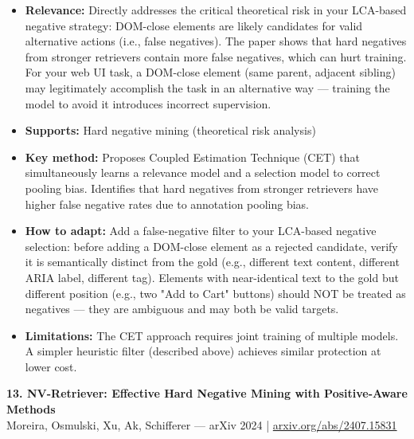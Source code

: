 \documentclass[pdflatex,sn-mathphys-num]{sn-jnl}
\theoremstyle{thmstyleone}
\theoremstyle{thmstyletwo}
\theoremstyle{thmstylethree}
\begin{document}
\begin{itemize}
    \item \textbf{Relevance:} Directly addresses the critical theoretical risk in your LCA-based negative strategy: DOM-close elements are likely candidates for valid alternative actions (i.e., false negatives). The paper shows that hard negatives from stronger retrievers contain more false negatives, which can hurt training. For your web UI task, a DOM-close element (same parent, adjacent sibling) may legitimately accomplish the task in an alternative way --- training the model to avoid it introduces incorrect supervision.
    \item \textbf{Supports:} \checkmark Hard negative mining (theoretical risk analysis)
    \item \textbf{Key method:} Proposes Coupled Estimation Technique (CET) that simultaneously learns a relevance model and a selection model to correct pooling bias. Identifies that hard negatives from stronger retrievers have higher false negative rates due to annotation pooling bias.
    \item \textbf{How to adapt:} Add a false-negative filter to your LCA-based negative selection: before adding a DOM-close element as a rejected candidate, verify it is semantically distinct from the gold (e.g., different text content, different ARIA label, different tag). Elements with near-identical text to the gold but different position (e.g., two "Add to Cart" buttons) should NOT be treated as negatives --- they are ambiguous and may both be valid targets.
    \item \textbf{Limitations:} The CET approach requires joint training of multiple models. A simpler heuristic filter (described above) achieves similar protection at lower cost.
\end{itemize}

\textbf{13. NV-Retriever: Effective Hard Negative Mining with Positive-Aware Methods} \\
Moreira, Osmulski, Xu, Ak, Schifferer --- arXiv 2024 | \href{https://arxiv.org/abs/2407.15831}{arxiv.org/abs/2407.15831}
\end{document}
